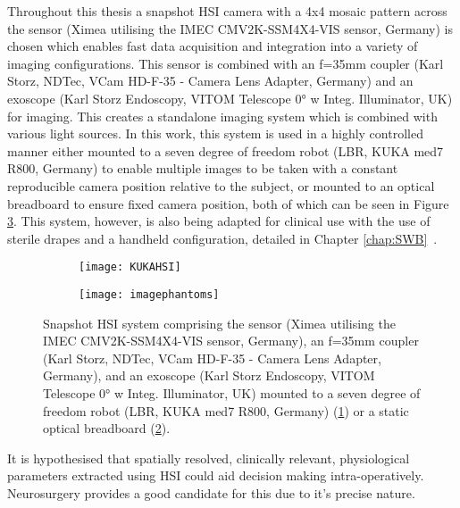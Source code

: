 Throughout this thesis a snapshot HSI camera with a 4x4 mosaic pattern across the sensor (Ximea utilising the IMEC CMV2K-SSM4X4-VIS sensor, Germany) is chosen which enables fast data acquisition and integration into a variety of imaging configurations. This sensor is combined with an f=35mm coupler (Karl Storz, NDTec, VCam HD-F-35 - Camera Lens Adapter, Germany) and an exoscope (Karl Storz Endoscopy, VITOM Telescope 0° w Integ. Illuminator, UK) for imaging. This creates a standalone imaging system which is combined with various light sources. In this work, this system is used in a highly controlled manner either mounted to a seven degree of freedom robot (LBR, KUKA med7 R800, Germany) to enable multiple images to be taken with a constant reproducible camera position relative to the subject, or mounted to an optical breadboard to ensure fixed camera position, both of which can be seen in Figure \ref{fig:HSIsetups}. This system, however, is also being adapted for clinical use with the use of sterile drapes and a handheld configuration, detailed in Chapter \ref{chap:SWB}~\cite{Budd2023}. 
\begin{figure}[h]
    \centering 
    \begin{subfigure}[ht!]{0.27\textwidth}
	\texttt{[image: KUKAHSI]}
	\caption{}
	\label{fig:KUKAHSI}
    \end{subfigure}
    \begin{subfigure}[ht!]{0.17\textwidth}
        \texttt{[image: imagephantoms]}
        \caption{}
        \label{fig:ScopeHSI}
    \end{subfigure}
    \caption{Snapshot HSI system comprising the sensor (Ximea utilising the IMEC CMV2K-SSM4X4-VIS sensor, Germany), an f=35mm coupler (Karl Storz, NDTec, VCam HD-F-35 - Camera Lens Adapter, Germany), and an exoscope (Karl Storz Endoscopy, VITOM Telescope 0° w Integ. Illuminator, UK) mounted to a seven degree of freedom robot (LBR, KUKA med7 R800, Germany) (\ref{fig:KUKAHSI}) or a static optical breadboard (\ref{fig:ScopeHSI}).}
    \label{fig:HSIsetups}
\end{figure}
%
It is hypothesised that spatially resolved, clinically relevant, physiological parameters extracted using HSI could aid decision making intra-operatively. Neurosurgery provides a good candidate for this due to it's precise nature. 

